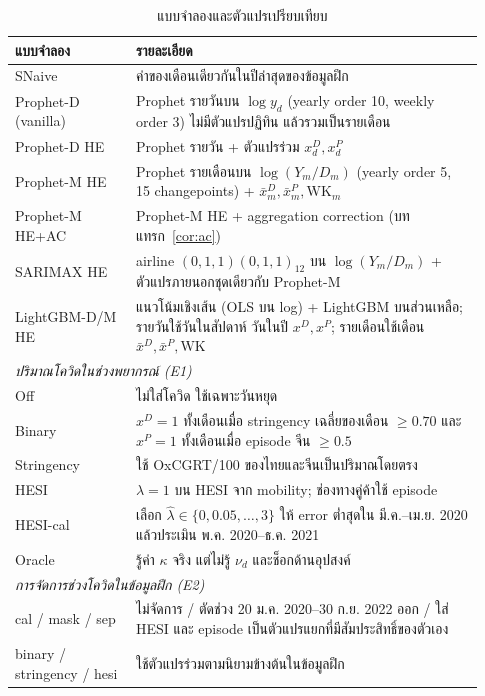 \documentclass{article}
\theoremstyle{definition}
\begin{document}
\begin{table}[t]
\centering\small
\caption{แบบจำลองและตัวแปรเปรียบเทียบ}
\label{tab:models}
\begin{tabular}{p{0.24\linewidth}p{0.69\linewidth}}
\toprule
แบบจำลอง & รายละเอียด \\
\midrule
SNaive & ค่าของเดือนเดียวกันในปีล่าสุดของข้อมูลฝึก \\
Prophet-D (vanilla) & Prophet รายวันบน $\log y_d$ (yearly order 10, weekly order 3) ไม่มีตัวแปรปฏิทิน แล้วรวมเป็นรายเดือน \\
Prophet-D HE & Prophet รายวัน + ตัวแปรร่วม $x^D_d, x^P_d$ \\
Prophet-M HE & Prophet รายเดือนบน $\log(Y_m/D_m)$ (yearly order 5, 15 changepoints) + $\bar x^D_m,\bar x^P_m,\mathrm{WK}_m$ \\
Prophet-M HE+AC & Prophet-M HE + aggregation correction (บทแทรก~\ref{cor:ac}) \\
SARIMAX HE & airline $(0,1,1)(0,1,1)_{12}$ บน $\log(Y_m/D_m)$ + ตัวแปรภายนอกชุดเดียวกับ Prophet-M \\
LightGBM-D/M HE & แนวโน้มเชิงเส้น (OLS บน log) + LightGBM บนส่วนเหลือ; รายวันใช้วันในสัปดาห์ วันในปี $x^D, x^P$; รายเดือนใช้เดือน $\bar x^D,\bar x^P,\mathrm{WK}$ \\
\midrule
\multicolumn{2}{l}{\textit{ปริมาณโควิดในช่วงพยากรณ์ (E1)}} \\
Off & ไม่ใส่โควิด ใช้เฉพาะวันหยุด \\
Binary & $x^D=1$ ทั้งเดือนเมื่อ stringency เฉลี่ยของเดือน $\ge 0.70$ และ $x^P=1$ ทั้งเดือนเมื่อ episode จีน $\ge 0.5$ \\
Stringency & ใช้ OxCGRT/100 ของไทยและจีนเป็นปริมาณโดยตรง \\
HESI & $\lambda=1$ บน HESI จาก mobility; ช่องทางคู่ค้าใช้ episode \\
HESI-cal & เลือก $\hat\lambda\in\{0,0.05,\ldots,3\}$ ให้ error ต่ำสุดใน มี.ค.--เม.ย. 2020 แล้วประเมิน พ.ค. 2020--ธ.ค. 2021 \\
Oracle & รู้ค่า $\kappa$ จริง แต่ไม่รู้ $\nu_d$ และช็อกด้านอุปสงค์ \\
\midrule
\multicolumn{2}{l}{\textit{การจัดการช่วงโควิดในข้อมูลฝึก (E2)}} \\
cal / mask / sep & ไม่จัดการ / ตัดช่วง 20 ม.ค. 2020--30 ก.ย. 2022 ออก / ใส่ HESI และ episode เป็นตัวแปรแยกที่มีสัมประสิทธิ์ของตัวเอง \\
binary / stringency / hesi & ใช้ตัวแปรร่วมตามนิยามข้างต้นในข้อมูลฝึก \\
\bottomrule
\end{tabular}
\end{table}
\end{document}
